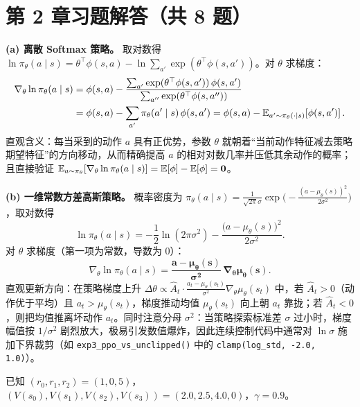 \section*{第 2 章习题解答（共 8 题）}


\textbf{(a) 离散 Softmax 策略。} 取对数得 $\ln \pi_\theta(a \mid s) = \theta^\top \phi(s, a) - \ln \sum_{a'} \exp(\theta^\top \phi(s, a'))$。对 $\theta$ 求梯度：
\begin{align*}
  \nabla_\theta \ln \pi_\theta(a \mid s)
  &= \phi(s, a) - \frac{\sum_{a'} \exp(\theta^\top \phi(s, a'))\,\phi(s, a')}{\sum_{a''} \exp(\theta^\top \phi(s, a''))} \\
  &= \phi(s, a) - \sum_{a'} \pi_\theta(a' \mid s)\,\phi(s, a')
  = \phi(s, a) - \mathbb{E}_{a' \sim \pi_\theta(\cdot \mid s)}\!\left[\phi(s, a')\right].
\end{align*}
直观含义：每当采到的动作 $a$ 具有正优势，参数 $\theta$ 就朝着“当前动作特征减去策略期望特征”的方向移动，从而精确提高 $a$ 的相对对数几率并压低其余动作的概率；且直接验证 $\mathbb{E}_{a \sim \pi_\theta}[\nabla_\theta \ln \pi_\theta(a \mid s)] = \mathbb{E}[\phi] - \mathbb{E}[\phi] = \mathbf{0}$。

\textbf{(b) 一维常数方差高斯策略。} 概率密度为 $\pi_\theta(a \mid s) = \frac{1}{\sqrt{2\pi}\sigma}\exp\!\Big(-\frac{(a - \mu_\theta(s))^2}{2\sigma^2}\Big)$，取对数得
\[
  \ln \pi_\theta(a \mid s) = -\frac{1}{2}\ln(2\pi\sigma^2) - \frac{\big(a - \mu_\theta(s)\big)^2}{2\sigma^2}.
\]
对 $\theta$ 求梯度（第一项为常数，导数为 $0$）：
\[
  \nabla_\theta \ln \pi_\theta(a \mid s) = \mathbf{\frac{a - \mu_\theta(s)}{\sigma^2}\,\nabla_\theta \mu_\theta(s)}.
\]
直观更新方向：在策略梯度上升 $\Delta\theta \propto \hat{A}_t \cdot \frac{a_t - \mu_\theta(s_t)}{\sigma^2}\nabla_\theta \mu_\theta(s_t)$ 中，若 $\hat{A}_t > 0$（动作优于平均）且 $a_t > \mu_\theta(s_t)$，梯度推动均值 $\mu_\theta(s_t)$ 向上朝 $a_t$ 靠拢；若 $\hat{A}_t < 0$，则把均值推离坏动作 $a_t$。同时注意分母 $\sigma^2$：当策略探索标准差 $\sigma$ 过小时，梯度幅值按 $1/\sigma^2$ 剧烈放大，极易引发数值爆炸，因此连续控制代码中通常对 $\ln \sigma$ 施加下界裁剪（如 \texttt{exp3\_ppo\_vs\_unclipped()} 中的 \texttt{clamp(log\_std, -2.0, 1.0)}）。


已知 $(r_0, r_1, r_2) = (1, 0, 5)$，$(V(s_0), V(s_1), V(s_2), V(s_3)) = (2.0, 2.5, 4.0, 0)$，$\gamma = 0.9$。

